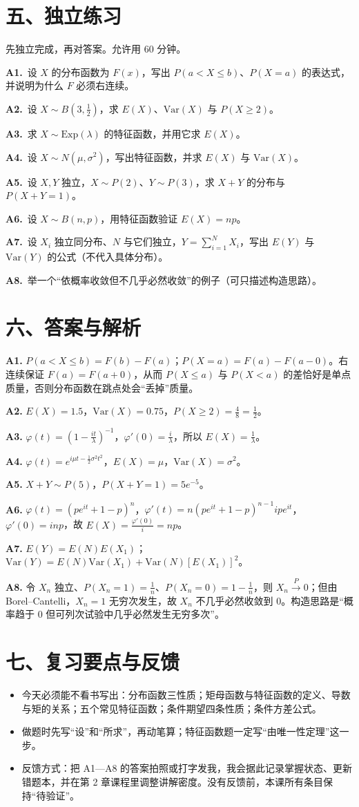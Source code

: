 \documentclass[UTF8,a4paper,11pt]{ctexart}
\newcommand{\PracticeQuestion}[3]{\par\Needspace{4\baselineskip}\noindent\begin{minipage}{\linewidth}\textbf{#1.}\ #2\par\noindent\rule{0pt}{#3mm}\par\end{minipage}\par}
\begin{document}
\section{五、独立练习}
先独立完成，再对答案。允许用 60 分钟。

\PracticeQuestion{A1}{设 $X$ 的分布函数为 $F(x)$，写出 $P(a<X\le b)$、$P(X=a)$ 的表达式，并说明为什么 $F$ 必须右连续。}{23}
\PracticeQuestion{A2}{设 $X\sim B(3,\frac12)$，求 $E(X)$、$\mathrm{Var}(X)$ 与 $P(X\ge 2)$。}{26}
\PracticeQuestion{A3}{求 $X\sim \mathrm{Exp}(\lambda)$ 的特征函数，并用它求 $E(X)$。}{34}
\PracticeQuestion{A4}{设 $X\sim N(\mu,\sigma^2)$，写出特征函数，并求 $E(X)$ 与 $\mathrm{Var}(X)$。}{35}
\PracticeQuestion{A5}{设 $X,Y$ 独立，$X\sim P(2)$、$Y\sim P(3)$，求 $X+Y$ 的分布与 $P(X+Y=1)$。}{35}
\PracticeQuestion{A6}{设 $X\sim B(n,p)$，用特征函数验证 $E(X)=np$。}{35}
\PracticeQuestion{A7}{设 $X_i$ 独立同分布、$N$ 与它们独立，$Y=\sum_{i=1}^N X_i$，写出 $E(Y)$ 与 $\mathrm{Var}(Y)$ 的公式（不代入具体分布）。}{35}
\PracticeQuestion{A8}{举一个“依概率收敛但不几乎必然收敛”的例子（可只描述构造思路）。}{35}
\clearpage
{}
\section{六、答案与解析}
\textbf{A1.} $P(a<X\le b)=F(b)-F(a)$；$P(X=a)=F(a)-F(a-0)$。右连续保证 $F(a)=F(a+0)$，从而 $P(X\le a)$ 与 $P(X<a)$ 的差恰好是单点质量，否则分布函数在跳点处会“丢掉”质量。

\textbf{A2.} $E(X)=1.5$，$\mathrm{Var}(X)=0.75$，$P(X\ge2)=\frac{4}{8}=\frac12$。

\textbf{A3.} $\varphi(t)=\left(1-\frac{it}{\lambda}\right)^{-1}$，$\varphi'(0)=\frac{i}{\lambda}$，所以 $E(X)=\frac{1}{\lambda}$。

\textbf{A4.} $\varphi(t)=e^{i\mu t-\frac12\sigma^2t^2}$，$E(X)=\mu$，$\mathrm{Var}(X)=\sigma^2$。

\textbf{A5.} $X+Y\sim P(5)$，$P(X+Y=1)=5e^{-5}$。

\textbf{A6.} $\varphi(t)=(pe^{it}+1-p)^n$，$\varphi'(t)=n(pe^{it}+1-p)^{n-1}ipe^{it}$，$\varphi'(0)=inp$，故 $E(X)=\frac{\varphi'(0)}{i}=np$。

\textbf{A7.} $E(Y)=E(N)E(X_1)$；$\mathrm{Var}(Y)=E(N)\mathrm{Var}(X_1)+\mathrm{Var}(N)[E(X_1)]^2$。

\textbf{A8.} 令 $X_n$ 独立、$P(X_n=1)=\frac1n$、$P(X_n=0)=1-\frac1n$，则 $X_n\xrightarrow{P}0$；但由 Borel–Cantelli，$X_n=1$ 无穷次发生，故 $X_n$ 不几乎必然收敛到 0。构造思路是“概率趋于 0 但可列次试验中几乎必然发生无穷多次”。

\section{七、复习要点与反馈}
\begin{itemize}
\item 今天必须能不看书写出：分布函数三性质；矩母函数与特征函数的定义、导数与矩的关系；五个常见特征函数；条件期望四条性质；条件方差公式。
\item 做题时先写“设”和“所求”，再动笔算；特征函数题一定写“由唯一性定理”这一步。
\item 反馈方式：把 A1—A8 的答案拍照或打字发我，我会据此记录掌握状态、更新错题本，并在第 2 章课程里调整讲解密度。没有反馈前，本课所有条目保持“待验证”。
\end{itemize}
\end{document}
